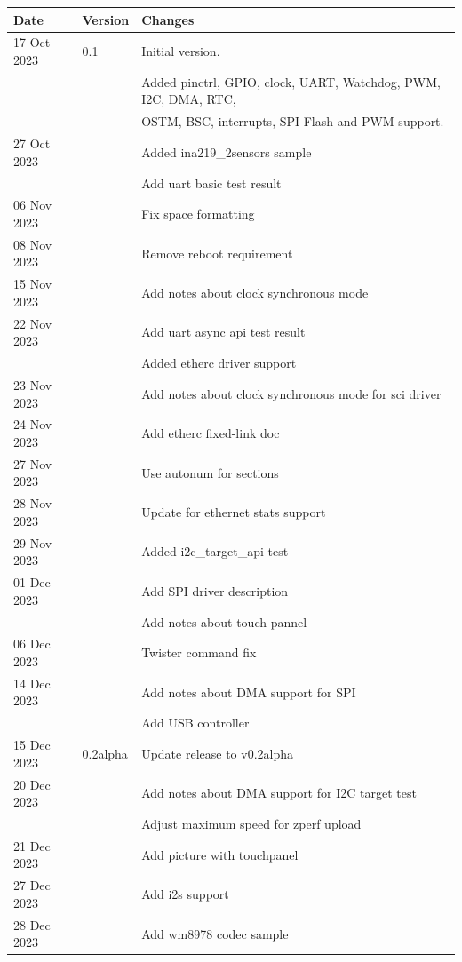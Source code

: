 \documentclass[11pt,a4paper,oneside]{article}
\begin{document}
\begin{tabular}{|l|l|l|}
	\hline
	\textbf{Date} & \textbf{Version} & \textbf{Changes} \\
	\hline
	17 Oct 2023 & 0.1 & Initial version. \\
	& & Added pinctrl, GPIO, clock, UART, Watchdog, PWM, I2C, DMA, RTC, \\
	& & OSTM, BSC, interrupts, SPI Flash and PWM support. \\
	\hline
	27 Oct 2023 & & Added ina219\_2sensors sample \\
	& & Add uart basic test result \\
	\hline
	06 Nov 2023 & & Fix space formatting \\
	\hline
	08 Nov 2023 & & Remove reboot requirement \\
	\hline
	15 Nov 2023 & & Add notes about clock synchronous mode \\
	\hline
	22 Nov 2023 & & Add uart async api test result \\
	& & Added etherc driver support \\
	\hline
	23 Nov 2023 & & Add notes about clock synchronous mode for sci driver \\
	\hline
	24 Nov 2023 & & Add etherc fixed-link doc \\
	\hline
	27 Nov 2023 & & Use autonum for sections \\
	\hline
	28 Nov 2023 & & Update for ethernet stats support \\
	\hline
	29 Nov 2023 & & Added i2c\_target\_api test \\
	\hline
	01 Dec 2023 & & Add SPI driver description \\
	& & Add notes about touch pannel \\
	\hline
	06 Dec 2023 & & Twister command fix \\
	\hline
	14 Dec 2023 & & Add notes about DMA support for SPI \\
	& & Add USB controller \\
	\hline
	15 Dec 2023 & 0.2alpha & Update release to v0.2alpha \\
	\hline
	20 Dec 2023 & & Add notes about DMA support for I2C target test \\
	& & Adjust maximum speed for zperf upload \\
	\hline
	21 Dec 2023 & & Add picture with touchpanel \\
	\hline
	27 Dec 2023 & & Add i2s support \\
	\hline
	28 Dec 2023 & & Add wm8978 codec sample \\
	\hline
\end{tabular}
\end{document}
